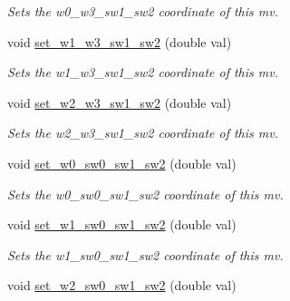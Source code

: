 \begin{DoxyCompactItemize}
\begin{DoxyCompactList}\small\item\em Sets the w0\-\_\-w3\-\_\-sw1\-\_\-sw2 coordinate of this mv. \end{DoxyCompactList}\item 
\hypertarget{classe3ga_1_1mv_ac99132a5e898e1672d39d9ad8c4e6480}{void \hyperlink{classe3ga_1_1mv_ac99132a5e898e1672d39d9ad8c4e6480}{set\-\_\-w1\-\_\-w3\-\_\-sw1\-\_\-sw2} (double val)}\label{classe3ga_1_1mv_ac99132a5e898e1672d39d9ad8c4e6480}

\begin{DoxyCompactList}\small\item\em Sets the w1\-\_\-w3\-\_\-sw1\-\_\-sw2 coordinate of this mv. \end{DoxyCompactList}\item 
\hypertarget{classe3ga_1_1mv_a2656eb4a460355ee0635bfd9a4bd1057}{void \hyperlink{classe3ga_1_1mv_a2656eb4a460355ee0635bfd9a4bd1057}{set\-\_\-w2\-\_\-w3\-\_\-sw1\-\_\-sw2} (double val)}\label{classe3ga_1_1mv_a2656eb4a460355ee0635bfd9a4bd1057}

\begin{DoxyCompactList}\small\item\em Sets the w2\-\_\-w3\-\_\-sw1\-\_\-sw2 coordinate of this mv. \end{DoxyCompactList}\item 
\hypertarget{classe3ga_1_1mv_a9d1a74a8e5bdffbb8a395bd5aca17318}{void \hyperlink{classe3ga_1_1mv_a9d1a74a8e5bdffbb8a395bd5aca17318}{set\-\_\-w0\-\_\-sw0\-\_\-sw1\-\_\-sw2} (double val)}\label{classe3ga_1_1mv_a9d1a74a8e5bdffbb8a395bd5aca17318}

\begin{DoxyCompactList}\small\item\em Sets the w0\-\_\-sw0\-\_\-sw1\-\_\-sw2 coordinate of this mv. \end{DoxyCompactList}\item 
\hypertarget{classe3ga_1_1mv_a2c4d45ffd1eb60dff345f843abcdd1ef}{void \hyperlink{classe3ga_1_1mv_a2c4d45ffd1eb60dff345f843abcdd1ef}{set\-\_\-w1\-\_\-sw0\-\_\-sw1\-\_\-sw2} (double val)}\label{classe3ga_1_1mv_a2c4d45ffd1eb60dff345f843abcdd1ef}

\begin{DoxyCompactList}\small\item\em Sets the w1\-\_\-sw0\-\_\-sw1\-\_\-sw2 coordinate of this mv. \end{DoxyCompactList}\item 
\hypertarget{classe3ga_1_1mv_a5e629046eb765f6989462dbc4d627281}{void \hyperlink{classe3ga_1_1mv_a5e629046eb765f6989462dbc4d627281}{set\-\_\-w2\-\_\-sw0\-\_\-sw1\-\_\-sw2} (double val)}\label{classe3ga_1_1mv_a5e629046eb765f6989462dbc4d627281}


\end{DoxyCompactItemize}
